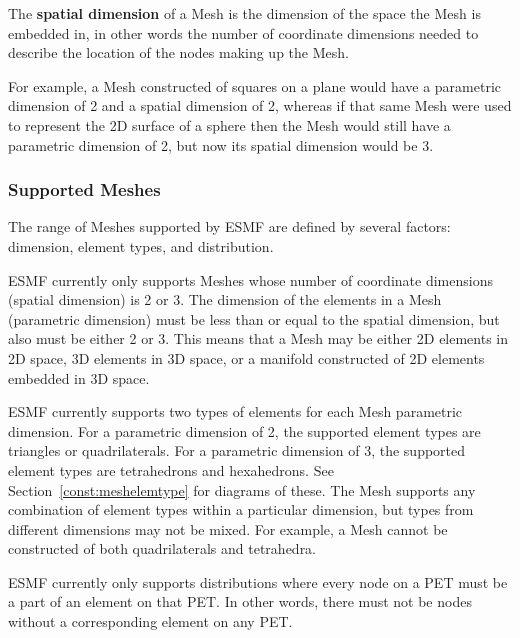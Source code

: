 The {\bf spatial dimension} of a Mesh is the dimension of the space the Mesh is embedded in, in other words the number of coordinate dimensions needed to describe the location of the nodes making up the Mesh. 

For example, a Mesh constructed of squares on a plane would have a parametric dimension of 2 and a spatial dimension of 2, 
whereas if that same Mesh were used to represent the 2D surface of a sphere then the Mesh would still have a parametric dimension 
of 2, but now its spatial dimension would be 3. 

\subsubsection{Supported Meshes}

The range of Meshes supported by ESMF are defined by several factors: dimension, element 
types, and distribution.

ESMF currently only supports Meshes whose number of coordinate dimensions (spatial dimension) 
is 2 or 3. The dimension of the elements in a Mesh (parametric dimension) must be less than 
or equal to the spatial dimension, but also must be either 2 or 3. This means that a Mesh may 
be either 2D elements in 2D space, 3D elements in 3D space, or a manifold constructed of 2D 
elements embedded in 3D space. 

ESMF currently supports two types of elements for each Mesh parametric dimension. For a 
parametric dimension of 2, the supported element types are triangles or quadrilaterals. For 
a parametric dimension of 3, the supported element types are tetrahedrons
and hexahedrons. See Section~\ref{const:meshelemtype} for diagrams of these. The Mesh 
supports any combination of element types within a particular dimension, but types from 
different dimensions may not be mixed.  For example, a Mesh cannot be constructed of both 
quadrilaterals and tetrahedra.

ESMF currently only supports distributions where every node on a PET must be a part of an 
element on that PET. In other words, there must not be nodes without a corresponding element 
on any PET.
